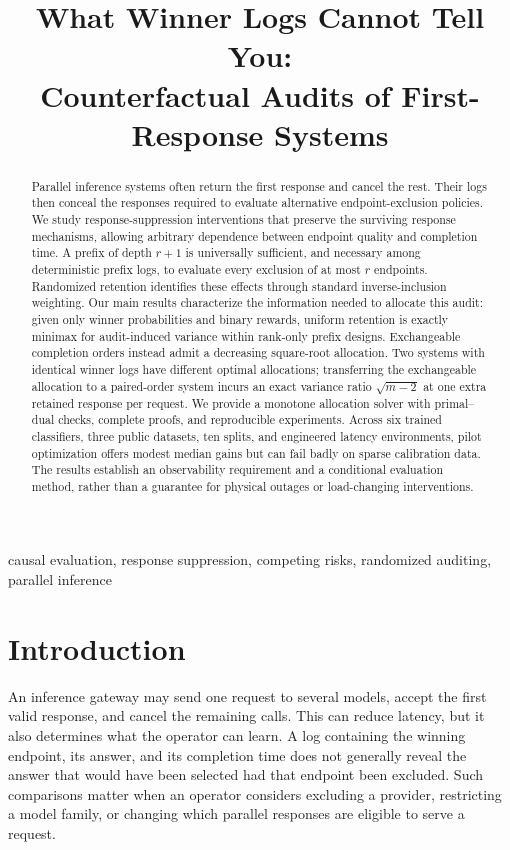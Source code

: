 \documentclass[12pt]{clear2027}
\title[Winner Logs and Counterfactual Audits]{What Winner Logs Cannot Tell You:\\Counterfactual Audits of First-Response Systems}
\begin{document}
\maketitle
\begin{abstract}
Parallel inference systems often return the first response and cancel the rest. Their logs then conceal the responses required to evaluate alternative endpoint-exclusion policies. We study response-suppression interventions that preserve the surviving response mechanisms, allowing arbitrary dependence between endpoint quality and completion time. A prefix of depth $r+1$ is universally sufficient, and necessary among deterministic prefix logs, to evaluate every exclusion of at most $r$ endpoints. Randomized retention identifies these effects through standard inverse-inclusion weighting. Our main results characterize the information needed to allocate this audit: given only winner probabilities and binary rewards, uniform retention is exactly minimax for audit-induced variance within rank-only prefix designs. Exchangeable completion orders instead admit a decreasing square-root allocation. Two systems with identical winner logs have different optimal allocations; transferring the exchangeable allocation to a paired-order system incurs an exact variance ratio $\sqrt{m-2}$ at one extra retained response per request. We provide a monotone allocation solver with primal--dual checks, complete proofs, and reproducible experiments. Across six trained classifiers, three public datasets, ten splits, and engineered latency environments, pilot optimization offers modest median gains but can fail badly on sparse calibration data. The results establish an observability requirement and a conditional evaluation method, rather than a guarantee for physical outages or load-changing interventions.
\end{abstract}
\begin{keywords}
causal evaluation, response suppression, competing risks, randomized auditing, parallel inference
\end{keywords}

\section{Introduction}
An inference gateway may send one request to several models, accept the first valid response, and cancel the remaining calls. This can reduce latency, but it also determines what the operator can learn. A log containing the winning endpoint, its answer, and its completion time does not generally reveal the answer that would have been selected had that endpoint been excluded. Such comparisons matter when an operator considers excluding a provider, restricting a model family, or changing which parallel responses are eligible to serve a request.
\end{document}
